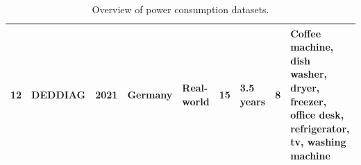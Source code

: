 \begin{table}
{\begin{tabular}{lllp{}lp{}lp{}p{}}
            12          & DEDDIAG          & 2021          & Germany           & Real-world    & 15                 & 3.5 years       & 8                      & Coffee machine, dish washer, dryer, freezer, office desk, refrigerator, tv, washing machine                                                                                                                                                                                                                                                                                                                                                                   \\ \hline
        \end{tabular}}
    \caption[Overview of power consumption datasets]{Overview of power consumption datasets.}
    \label{tab:datasets_overview}
\end{table}

